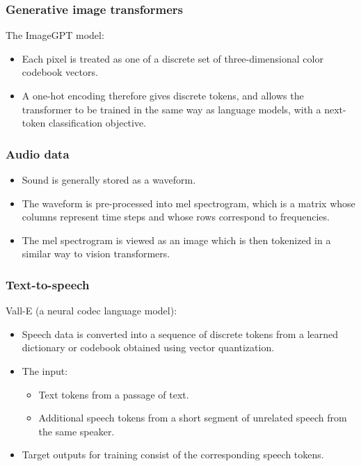 \documentclass{beamer}
\begin{document}
\begin{frame}
    \frametitle{Generative image transformers}
    The ImageGPT model:
    \begin{itemize}
        \item Each pixel is treated as one of a discrete set of three-dimensional color codebook vectors.
        \item A one-hot encoding therefore gives discrete tokens, and allows the transformer to be trained in the same way as language models, with a next-token classification objective.
    \end{itemize}
\end{frame}

\begin{frame}
    \frametitle{Audio data}
    \begin{itemize}
        \item Sound is generally stored as a waveform.
        \item The waveform is pre-processed into mel spectrogram, which is a matrix whose columns represent time steps and whose rows correspond to frequencies.
        \item The mel spectrogram is viewed as an image which is then tokenized in a similar way to vision transformers.
    \end{itemize}
\end{frame}

\begin{frame}
    \frametitle{Text-to-speech}
    Vall-E (a neural codec language model):
    \begin{itemize}
        \item Speech data is converted into a sequence of discrete tokens from a learned dictionary or codebook obtained using vector quantization.
        \item The input:
        \begin{itemize}
            \item Text tokens from a passage of text.
            \item Additional speech tokens from a short segment of unrelated speech from the same speaker.
        \end{itemize}
        \item Target outputs for training consist of the corresponding speech tokens.
    \end{itemize}
\end{frame}
\end{document}
